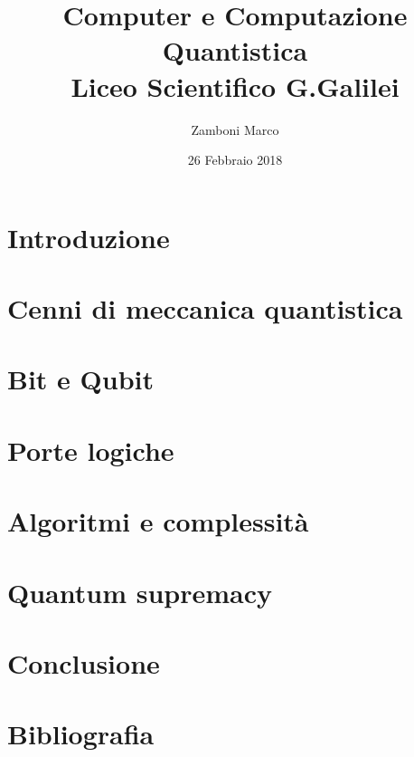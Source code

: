 \documentclass[10pt]{report}
\author{Zamboni Marco}
\date{26 Febbraio 2018}
\title{{Computer e Computazione Quantistica}\\
		{\large Liceo Scientifico G.Galilei}}
\begin{document}

\tableofcontents
\chapter{Introduzione}

\chapter{Cenni di meccanica quantistica}

\chapter{Bit e Qubit}

\chapter{Porte logiche}

\chapter{Algoritmi e complessità}

\chapter{Quantum supremacy}

\chapter{Conclusione}

\appendix
\chapter{Bibliografia}

\end{document}
